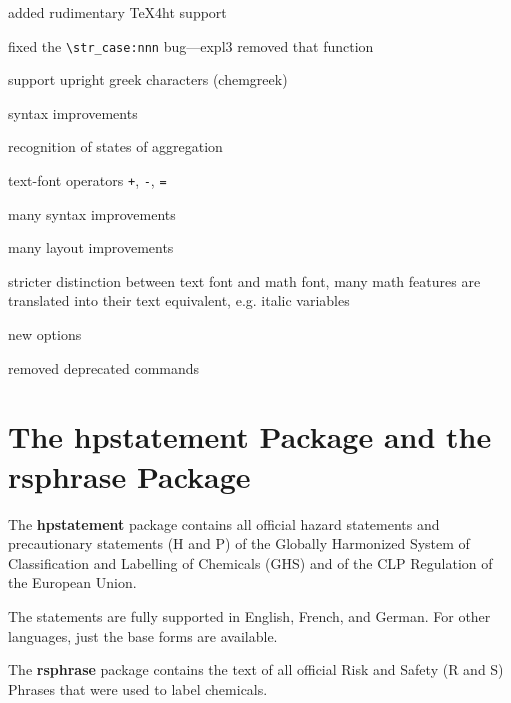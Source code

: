 \documentclass[a4paper,notitlepage,parskip=half]{scrreprt}
\begin{document}
\begin{compactitem}
\item added rudimentary TeX4ht support
\item fixed the \verb|\str_case:nnn| bug---expl3 removed that function
\end{compactitem}

\begin{compactitem}
\item support upright greek characters (chemgreek)
\item syntax improvements%
\item recognition of states of aggregation%
\item text-font operators \verb|+|, \verb|-|, \verb|=|
\end{compactitem}

\begin{compactitem}
\item many syntax improvements
\item many layout improvements
\item stricter distinction between text font and math font, many math features are translated into their text equivalent, e.g. italic variables
\item new options
\item removed deprecated commands
\end{compactitem}



\chapter{The hpstatement Package and the rsphrase Package}\label{sec:rsphrase}

The \textbf{hpstatement} package contains all official
hazard statements and precautionary statements (H and P) of the
Globally Harmonized System of Classification and Labelling of Chemicals (GHS)
and of the CLP Regulation of the European Union.

The statements are fully supported in
  English,
  French,
  and
  German.
For other languages, just the base forms are available.

\bigskip

The \textbf{rsphrase} package contains the text of all official
Risk and Safety (R and S) Phrases that were used to label chemicals.
\end{document}
